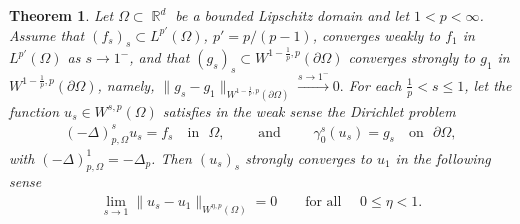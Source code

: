 \documentclass[10pt,a4paper]{amsart}
\newtheorem{theorem}{Theorem}
\DeclareMathOperator{\R}{\mathbb{R}}
\begin{document}
\begin{theorem}
\label{thm:converg-dirichlet-frac-regional}
Let $\Omega \subset \R^d$ be a bounded Lipschitz domain and let $1<p<\infty$. Assume that $(f_s)_s \subset L^{p'}(\Omega)$, $p'=p/(p-1)$, converges weakly to $f_1$ in $L^{p'}(\Omega)$ as $s\to 1^-$, and that $(g_s)_s \subset W^{1-\frac{1}{p},p}(\partial\Omega)$ converges strongly to $g_1$ in $W^{1-\frac{1}{p},p}(\partial\Omega)$, namely, $\|g_s-g_1\|_{W^{1-\frac{1}{p},p}(\partial\Omega)}
\xrightarrow{s\to1^-}0.$  For each $\frac{1}{p} < s \le 1$, let  the function
$u_s \in W^{s,p}(\Omega)$ satisfies in the weak sense the Dirichlet problem
\begin{align*}
(-\Delta)^s_{p,\Omega} u_s= f_s \quad \text{in }\,\,  \Omega, \qquad \text{  and }\qquad \gamma^s_0 (u_s )= g_s \quad \text{on } \,\, \partial \Omega,
\end{align*}
\noindent with $(-\Delta)^1_{p,\Omega}=-\Delta_{p} $. Then $(u_s)_s$ strongly converges to $u_1$  in the following sense
\begin{align*}
\lim_{s\to1}\|u_s -u_1\|_{W^{\eta,p}(\Omega)} =0 \qquad\text{for all }\quad 0\leq \eta<1.
\end{align*}
\end{theorem}
\end{document}
